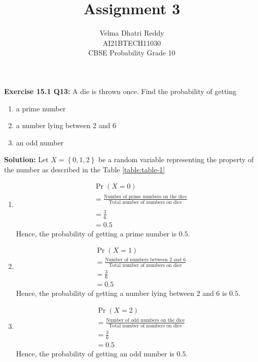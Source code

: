 \documentclass[journal,11pt,twocolumn]{IEEEtran}
\title{Assignment 3}
\author{Velma Dhatri Reddy \\ \normalsize AI21BTECH11030 \\ \vspace*{10pt} \Large CBSE Probability Grade 10}
\providecommand{\pr}[1]{\ensuremath{\Pr\left(#1\right)}}
\providecommand{\cbrak}[1]{\ensuremath{\left\{#1\right\}}}
\begin{document}
\maketitle
\textbf{Exercise 15.1 Q13:}
A die is thrown once. Find the probability of getting	\begin{enumerate}[label=(\roman*)]
		\item a prime number
		\item a number lying between 2 and 6
		\item an odd number
\end{enumerate}

\textbf{Solution:} Let $X=\cbrak{0,1,2}$ be a random variable representing the property of the number as described in the Table	\eqref{table:table-1}

\begin{table}[ht!]
	
	\vspace*{5pt}
\caption{}
	\label{table:table-1}
\end{table}
\begin{enumerate}[label=(\roman*)]
	\item
\begin{align}
    &\pr{X=0} \\
    &= \frac{\text{Number of prime numbers on the dice}}{\text{Total number of numbers on dice}}\\ \\
    &=\frac{3}{6}\\
    &=0.5
\end{align}
Hence, the probability of getting a prime number is $0.5$.
	\item 
\begin{align}
    &\pr{X=1} \\
    &= \frac{\text{Number of numbers between 2 and 6}}{\text{Total number of numbers on dice}}\\
 	&=\frac{3}{6}\\
	&=0.5
\end{align}
Hence, the probability of getting a number lying between 2 and 6 is $0.5$.
	\item 
\begin{align}
    &\pr{X=2} \\
    &= \frac{\text{Number of odd numbers on the dice}}{\text{Total number of numbers on dice}}\\
	&=\frac{3}{6}\\
    &=0.5
\end{align}
Hence, the probability of getting an odd number is $0.5$.
\end{enumerate}
\end{document}
